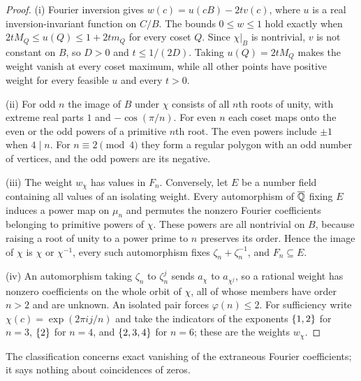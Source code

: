 \begin{proof}
(i) Fourier inversion gives $w(c)=u(cB)-2tv(c)$, where $u$ is a real inversion-invariant function on
$C/B$. The bounds $0\le w\le1$ hold exactly when $2tM_Q\le u(Q)\le1+2tm_Q$ for every coset $Q$. Since
$\chi|_B$ is nontrivial, $v$ is not constant on $B$, so $D>0$ and $t\le1/(2D)$. Taking $u(Q)=2tM_Q$ makes
the weight vanish at every coset maximum, while all other points have positive weight for every feasible
$u$ and every $t>0$.

(ii) For odd $n$ the image of $B$ under $\chi$ consists of all $n$th roots of unity, with extreme real
parts $1$ and $-\cos(\pi/n)$. For even $n$ each coset maps onto the even or the odd powers of a primitive
$n$th root. The even powers include $\pm1$ when $4\mid n$. For $n\equiv2\pmod4$ they form a regular polygon
with an odd number of vertices, and the odd powers are its negative.

(iii) The weight $w_\chi$ has values in $F_n$. Conversely, let $E$ be a number field containing all values
of an isolating weight. Every automorphism of $\overline{\mathbb{Q}}$ fixing $E$ induces a power map on $\mu_n$ and
permutes the nonzero Fourier coefficients belonging to primitive powers of $\chi$. These powers are all
nontrivial on $B$, because raising a root of unity to a power prime to $n$ preserves its order. Hence the
image of $\chi$ is $\chi$ or $\chi^{-1}$, every such automorphism fixes $\zeta_n+\zeta_n^{-1}$, and
$F_n\subseteq E$.

(iv) An automorphism taking $\zeta_n$ to $\zeta_n^j$ sends $a_\chi$ to $a_{\chi^j}$, so a rational weight
has nonzero coefficients on the whole orbit of $\chi$, all of whose members have order $n>2$ and are
unknown. An isolated pair forces $\varphi(n)\le2$. For sufficiency write $\chi(c)=\exp(2\pi ij/n)$ and take
the indicators of the exponents $\{1,2\}$ for $n=3$, $\{2\}$ for $n=4$, and $\{2,3,4\}$ for $n=6$;
these are the weights $w_\chi$.
\end{proof}

The classification concerns exact vanishing of the extraneous Fourier coefficients; it says nothing about
coincidences of zeros.

